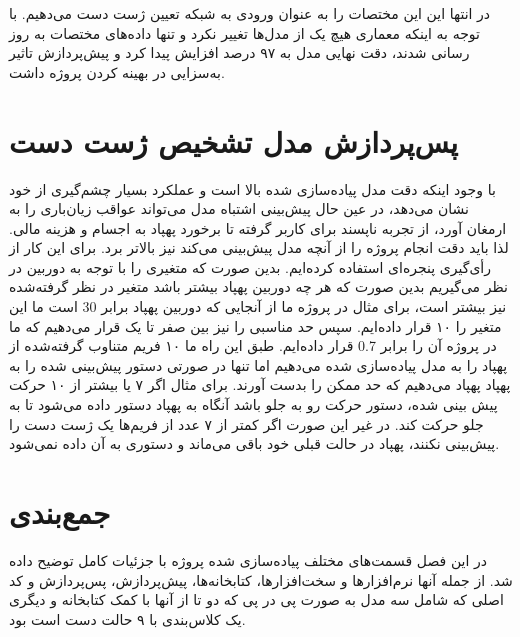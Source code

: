 در انتها این این مختصات را به عنوان ورودی به شبکه تعیین ژست دست می‌دهیم. با توجه به اینکه معماری هیچ یک از مدل‌ها تغییر نکرد و تنها داده‌های مختصات به روز رسانی شدند، 
دقت نهایی مدل به ۹۷ درصد افزایش پیدا کرد و پیش‌پردازش تاثیر به‌سزایی در بهینه کردن پروژه داشت.


\section{پس‌پردازش مدل تشخیص ژست دست}
با وجود اینکه دقت مدل پیاده‌سازی شده بالا است و عملکرد بسیار چشم‌گیری از خود نشان می‌دهد، در عین حال پیش‌بینی اشتباه مدل می‌تواند عواقب زیان‌باری را به ارمغان آورد، 
از تجربه ناپسند برای کاربر گرفته تا برخورد پهپاد به اجسام و هزینه مالی. لذا باید دقت انجام پروژه را از آنچه مدل پیش‌بینی می‌کند نیز بالاتر برد. برای این کار از رأی‌گیری پنجره‌ای 
استفاده کرده‌ایم. بدین صورت که متغیری را با توجه به  دوربین در نظر می‌گیریم بدین صورت که هر چه  دوربین پهپاد بیشتر باشد متغیر در نظر گرفته‌شده نیز بیشتر 
است، برای مثال در پروژه ما از آنجایی که دوربین پهپاد برابر 30  است ما این متغیر را ۱۰ قرار داده‌ایم.  سپس حد مناسبی را نیز بین صفر تا یک قرار می‌دهیم که ما در 
پروژه آن را برابر 0.7  قرار داده‌ایم. طبق این راه ما ۱۰ فریم متناوب گرفته‌شده از پهپاد را به مدل پیاده‌سازی شده می‌دهیم اما تنها در صورتی دستور پیش‌بینی شده را به پهپاد
پهپاد می‌دهیم که حد ممکن را بدست آورند. برای مثال اگر ۷ یا بیشتر از ۱۰ حرکت پیش بینی شده، دستور حرکت رو به جلو باشد آنگاه به پهپاد دستور داده می‌شود تا به جلو حرکت کند. 
در غیر این صورت اگر کمتر از ۷ عدد از فریم‌ها یک ژست دست را پیش‌بینی نکنند، پهپاد در حالت قبلی خود باقی می‌ماند و دستوری به آن داده نمی‌شود.


\section{جمع‌بندی}
در این فصل قسمت‌های مختلف پیاده‌سازی شده پروژه با جزئیات کامل توضیح داده شد. از جمله آنها نرم‌افزار‌ها و سخت‌افزارها، کتابخانه‌ها، پیش‌پردازش، پس‌پردازش و کد اصلی که شامل سه مدل به صورت پی در پی که دو تا از آنها با کمک کتابخانه  و دیگری یک کلاس‌بندی با ۹ حالت دست است بود.

